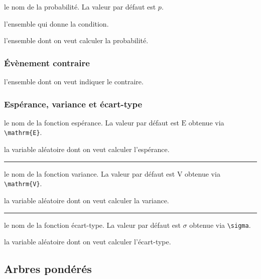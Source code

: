 \documentclass[12pt,a4paper]{book}
\theoremstyle{definition}
\newcommand\separation{
	\medskip
	\hfill\rule{0.5\textwidth}{0.75pt}\hfill
	\medskip
}
\newcommand\extraspace{
	\vspace{0.25em}
}
\begin{document}
{{


\extraspace




\IDoption{} le nom de la probabilité. La valeur par défaut est $p$.

 l'ensemble qui donne la condition.

 l'ensemble dont on veut calculer la probabilité.


\subsubsection{Évènement contraire}




\IDarg{} l'ensemble dont on veut indiquer le contraire.


\subsubsection{Espérance, variance et écart-type}




\IDoption{} le nom de la fonction espérance. La valeur par défaut est $\mathrm{E}$ obtenue via \verb#\mathrm{E}#.

\IDarg{} la variable aléatoire dont on veut calculer l'espérance.


\separation



\IDoption{} le nom de la fonction variance. La valeur par défaut est $\mathrm{V}$ obtenue via \verb#\mathrm{V}#.

\IDarg{} la variable aléatoire dont on veut calculer la variance.


\separation



\IDoption{} le nom de la fonction écart-type. La valeur par défaut est $\sigma$ obtenue via \verb#\sigma#.

\IDarg{} la variable aléatoire dont on veut calculer l'écart-type.


\subsection{Arbres pondérés}



}}
\end{document}
